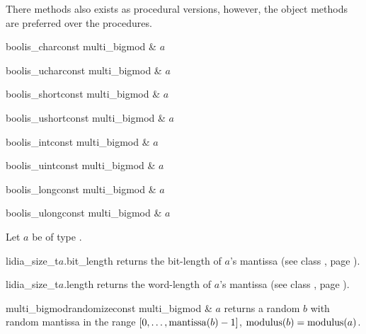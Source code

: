 There methods also exists as procedural versions, however, the object methods are preferred over
the procedures.
\begin{fcode}{bool}{is_char}{const multi_bigmod & $a$}\end{fcode}
\begin{fcode}{bool}{is_uchar}{const multi_bigmod & $a$}\end{fcode}
\begin{fcode}{bool}{is_short}{const multi_bigmod & $a$}\end{fcode}
\begin{fcode}{bool}{is_ushort}{const multi_bigmod & $a$}\end{fcode}
\begin{fcode}{bool}{is_int}{const multi_bigmod & $a$}\end{fcode}
\begin{fcode}{bool}{is_uint}{const multi_bigmod & $a$}\end{fcode}
\begin{fcode}{bool}{is_long}{const multi_bigmod & $a$}\end{fcode}
\begin{fcode}{bool}{is_ulong}{const multi_bigmod & $a$}\end{fcode}



\BASIC

Let $a$ be of type .

\begin{cfcode}{lidia_size_t}{$a$.bit_length}{}
  returns the bit-length of $a$'s mantissa (see class , page \pageref{class:bigint}).
\end{cfcode}

\begin{cfcode}{lidia_size_t}{$a$.length}{}
  returns the word-length of $a$'s mantissa (see class , page
  \pageref{class:bigint}).
\end{cfcode}



\HIGH

\begin{fcode}{multi_bigmod}{randomize}{const multi_bigmod & $a$}
  returns a random  $b$ with random mantissa in the range
  $[0, \dots, \operatorname{mantissa}(b)-1]$, $\operatorname{modulus}(b) = \operatorname{modulus}(a)$.
\end{fcode}

